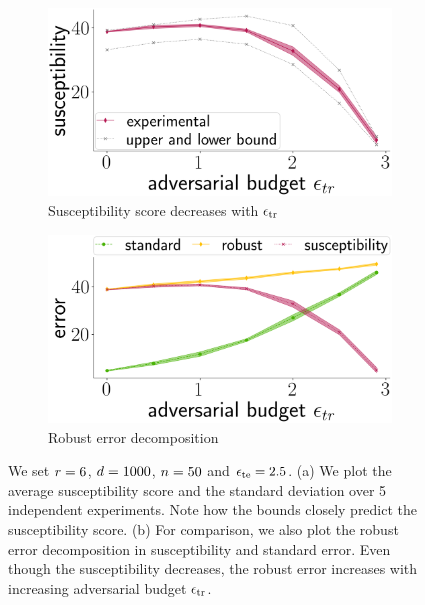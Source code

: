  
 \begin{figure}[!b]
  \centering
\begin{subfigure}[b]{0.4\textwidth}
 \centering
  \includegraphics[width=0.99\linewidth]{plotsAistats/app_susceptibilty.png}
  \caption{Susceptibility score decreases with $\epsilon_{\text{tr}}$}
  \label{fig:app_robustness}
\end{subfigure}
\begin{subfigure}[b]{0.4\textwidth}
 \centering
  \includegraphics[width=0.99\linewidth]{plotsAistats/logreg_trade_off_plot.png}
  \caption{Robust error decomposition}
  \label{fig:app_tradeoff_logreg}
\end{subfigure}
\caption{We set $r = 6$, $d = 1000$, $n = 50$ and $\epsilon_{\text{te}} = 2.5$. (a) We plot the average susceptibility score and the standard deviation over 5 independent experiments. Note how the bounds closely predict the susceptibility score. (b) For comparison, we also plot the robust error decomposition in susceptibility and standard error. Even though the susceptibility decreases, the robust error increases with increasing adversarial budget $\epsilon_{\text{tr}}$.}
  \vspace{-0.2in}
\label{fig:logreg_robust}
\end{figure}

